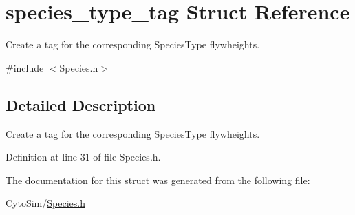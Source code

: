 \hypertarget{structspecies__type__tag}{\section{species\-\_\-type\-\_\-tag Struct Reference}
\label{structspecies__type__tag}
}


Create a tag for the corresponding Species\-Type flywheights.  




{\ttfamily \#include $<$Species.\-h$>$}



\subsection{Detailed Description}
Create a tag for the corresponding Species\-Type flywheights. 

Definition at line 31 of file Species.\-h.



The documentation for this struct was generated from the following file\-:\begin{DoxyCompactItemize}
\item 
Cyto\-Sim/\hyperlink{Species_8h}{Species.\-h}\end{DoxyCompactItemize}
